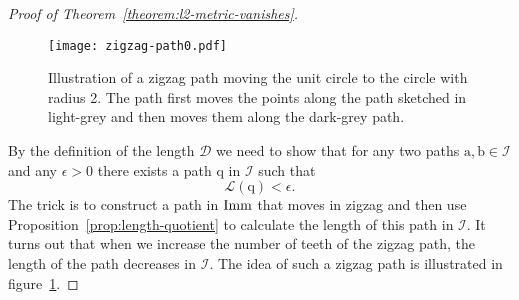 \begin{proof}[Proof of Theorem~\ref{theorem:l2-metric-vanishes}]

  \begin{figure}
    \centerline{\texttt{[image: zigzag-path0.pdf]}}
    \caption[]{Illustration of a zigzag path moving the unit circle to the circle with radius 2. The path first moves the points along the path sketched in light-grey and then moves them along the dark-grey path.}
    \label{fig:zigzag-path}
  \end{figure}

  By the definition of the length $\mathcal{D}$ we need to show that for any two paths $\mathrm{a},\mathrm{b} \in \mathcal{I}$ and any $\epsilon >0 $ there exists a path $\mathrm{q}$ in $\mathcal{I}$ such that
  \begin{equation*}
    \mathcal{L}(\mathrm{q}) < \epsilon.
  \end{equation*}
  The trick is to construct a path in $\mathop{}\!\mathrm{Imm}$ that moves in zigzag and then use Proposition~\ref{prop:length-quotient} to calculate the length of this path in $\mathcal{I}$.
  It turns out that when we increase the number of teeth of the zigzag path, the length of the path decreases in $\mathcal{I}$.
  The idea of such a zigzag path is illustrated in figure~\ref{fig:zigzag-path}.


\end{proof}
